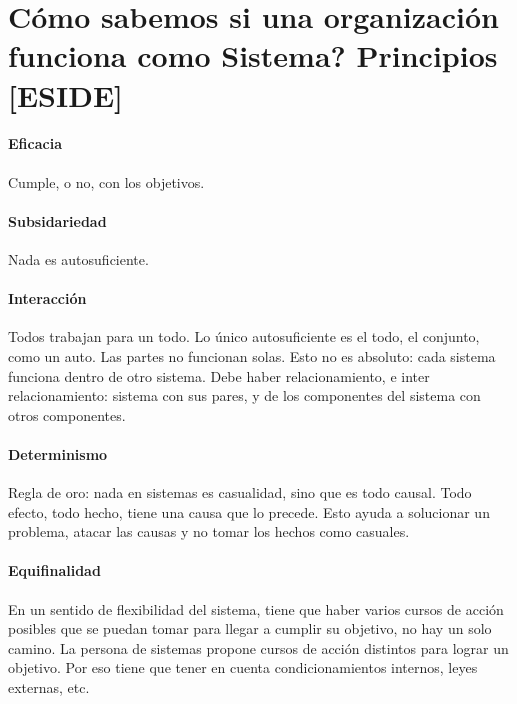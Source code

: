 \hypertarget{cuxf3mo-sabemos-si-una-organizaciuxf3n-funciona-como-sistema-principios-eside}{%
\section{Cómo sabemos si una organización funciona como Sistema?
Principios
{[}ESIDE{]}}\label{cuxf3mo-sabemos-si-una-organizaciuxf3n-funciona-como-sistema-principios-eside}}
\hypertarget{eficacia}{%
\paragraph{Eficacia}\label{eficacia}}
Cumple, o no, con los objetivos.

\hypertarget{subsidariedad}{%
\paragraph{Subsidariedad}\label{subsidariedad}}
Nada es autosuficiente.

\hypertarget{interaccion}{%
\paragraph{Interacción}\label{interaccion}}
Todos trabajan para un todo. Lo único autosuficiente es el todo, el conjunto, como un auto. Las partes no funcionan solas. Esto no es absoluto: cada sistema funciona dentro de otro sistema. Debe haber relacionamiento, e inter relacionamiento: sistema con sus pares, y de los componentes del sistema con otros componentes.

\hypertarget{determinismo}{%
\paragraph{Determinismo}\label{determinismo}}
Regla de oro: nada en sistemas es casualidad, sino que es todo causal. Todo efecto, todo hecho, tiene una causa que lo precede. Esto ayuda a solucionar un problema, atacar las causas y no tomar los hechos como casuales.

\hypertarget{equifinalidad}{%
\paragraph{Equifinalidad}\label{equifinalidad}}
En un sentido de flexibilidad del sistema, tiene que haber varios cursos de acción posibles que se puedan tomar para llegar a cumplir su objetivo, no hay un solo camino. La persona de sistemas propone cursos de acción distintos para lograr un objetivo. Por eso tiene que tener en cuenta condicionamientos internos, leyes externas, etc.

